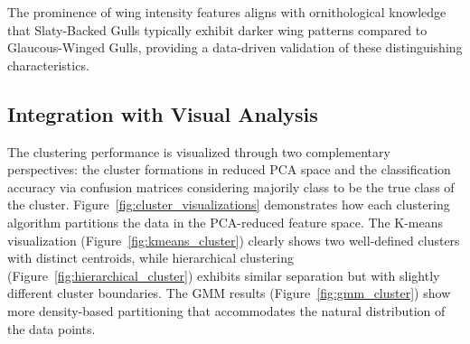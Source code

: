\documentclass[a4paper,12pt]{report}
\begin{document}
The prominence of wing intensity features aligns with ornithological knowledge that Slaty-Backed Gulls typically exhibit darker wing patterns compared to Glaucous-Winged Gulls, providing a data-driven validation of these distinguishing characteristics.

\subsection{Integration with Visual Analysis}

The clustering performance is visualized through two complementary perspectives: the cluster formations in reduced PCA space and the classification accuracy via confusion matrices considering majorily class to be the true class of the cluster.
Figure~\ref{fig:cluster_visualizations} demonstrates how each clustering algorithm partitions the data in the PCA-reduced feature space. The K-means visualization (Figure~\ref{fig:kmeans_cluster}) clearly shows two well-defined clusters with distinct centroids, while hierarchical clustering (Figure~\ref{fig:hierarchical_cluster}) exhibits similar separation but with slightly different cluster boundaries. The GMM results (Figure~\ref{fig:gmm_cluster}) show more density-based partitioning that accommodates the natural distribution of the data points.
\end{document}
